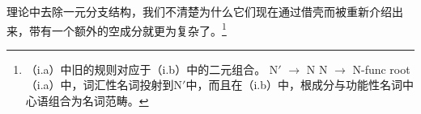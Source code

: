 理论中去除一元分支结构，我们不清楚为什么它们现在通过借壳而被重新介绍出来，带有一个额外的空成分就更为复杂了。\footnote{%
（i.a）中旧的\xbarc 规则对应于（i.b）中的二元组合。
\eal
\ex N$'$ $\to$ N
\ex N $\to$ N-func root 
\zl
（i.a）中，词汇性名词投射到N$'$中，而且在（i.b）中，根成分与功能性名词中心语组合为名词范畴。
}
